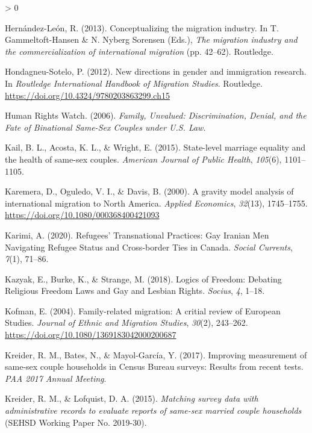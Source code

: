 \documentclass[
  11pt,
]{article}
\newlength{\cslhangindent}
\newenvironment{CSLReferences}[2] %
 {%
  \setlength{\parindent}{0pt}
  \ifodd #1 \everypar{\setlength{\hangindent}{\cslhangindent}}\ignorespaces\fi
  \ifnum #2 > 0
  \setlength{\parskip}{#2\baselineskip}
  \fi
 }%
 {}
\begin{document}
\begin{CSLReferences}{1}{0}
\leavevmode\hypertarget{ref-hernandez-leon_2013}{}%
Hernández-León, R. (2013). Conceptualizing the migration industry. In T. Gammeltoft-Hansen \& N. Nyberg Sorensen (Eds.), \emph{The migration industry and the commercialization of international migration} (pp. 42--62). {Routledge}.

\leavevmode\hypertarget{ref-hondagneu-sotelo_2012}{}%
Hondagneu-Sotelo, P. (2012). New directions in gender and immigration research. In \emph{Routledge {International Handbook} of {Migration Studies}}. {Routledge}. \url{https://doi.org/10.4324/9780203863299.ch15}

\leavevmode\hypertarget{ref-humanrightswatch_2006}{}%
Human Rights Watch. (2006). \emph{Family, {Unvalued}: {Discrimination}, {Denial}, and the {Fate} of {Binational Same}-{Sex Couples} under {U}.{S}. {Law}}.

\leavevmode\hypertarget{ref-kail_2015}{}%
Kail, B. L., Acosta, K. L., \& Wright, E. (2015). State-level marriage equality and the health of same-sex couples. \emph{American Journal of Public Health}, \emph{105}(6), 1101--1105.

\leavevmode\hypertarget{ref-karemera_2000}{}%
Karemera, D., Oguledo, V. I., \& Davis, B. (2000). A gravity model analysis of international migration to {North America}. \emph{Applied Economics}, \emph{32}(13), 1745--1755. \url{https://doi.org/10.1080/000368400421093}

\leavevmode\hypertarget{ref-karimi_2020}{}%
Karimi, A. (2020). Refugees' {Transnational Practices}: {Gay Iranian Men Navigating Refugee Status} and {Cross}-border {Ties} in {Canada}. \emph{Social Currents}, \emph{7}(1), 71--86.

\leavevmode\hypertarget{ref-kazyak_2018}{}%
Kazyak, E., Burke, K., \& Strange, M. (2018). Logics of {Freedom}: {Debating Religious Freedom Laws} and {Gay} and {Lesbian Rights}. \emph{Socius}, \emph{4}, 1--18.

\leavevmode\hypertarget{ref-kofman_2004_family}{}%
Kofman, E. (2004). Family-related migration: A critial review of {European Studies}. \emph{Journal of Ethnic and Migration Studies}, \emph{30}(2), 243--262. \url{https://doi.org/10.1080/1369183042000200687}

\leavevmode\hypertarget{ref-kreider_2017}{}%
Kreider, R. M., Bates, N., \& Mayol-García, Y. (2017). Improving measurement of same-sex couple households in {Census Bureau} surveys: {Results} from recent tests. \emph{{PAA} 2017 Annual Meeting}.

\leavevmode\hypertarget{ref-kreider_2015}{}%
Kreider, R. M., \& Lofquist, D. A. (2015). \emph{Matching survey data with administrative records to evaluate reports of same-sex married couple households} (SEHSD Working Paper No. 2019-30).


\end{CSLReferences}
\end{document}
